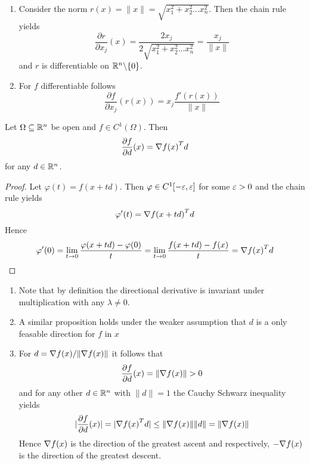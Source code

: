\begin{examples}\hfill
    \begin{enumerate}
        \item Consider the norm \( r(x) = \|x\| = \sqrt{x_1^2 + x_2^2 \dots x_n^2} \). Then the chain rule yields
              \[
                  \frac{\partial r}{\partial x_j}(x) = \frac{2 x_j}{2 \sqrt{x_1^2 + x_2^2 \dots x_n^2}}
                  = \frac{x_j}{\|x\|}
              \]
              and \( r \) is differentiable on \( \mathbb{R}^n {\setminus} \{ 0 \} \).
        \item For \( f \) differentiable follows
              \[
                  \frac{\partial f}{\partial x_j}(r(x)) = x_j \frac{f'(r(x))}{\|x\|}
              \]
    \end{enumerate}
\end{examples}
\bigskip


\begin{lemma}\label{lemma:directional_derivative}
    Let \( \Omega \subseteq \mathbb{R}^n \) be open and \( f \in C^1(\Omega) \). Then
    \[
        \frac{\partial f}{\partial d}(x) = \nabla{f(x)}^T d
    \]
    for any \( d \in \mathbb{R}^n \).
\end{lemma}

\begin{proof}
    Let \( \varphi(t) = f(x + td) \). Then \( \varphi \in C^1[-\varepsilon, \varepsilon ] \) for some \( \varepsilon > 0 \)
    and the chain rule yields
    \[
        \varphi'(t) = {\nabla f(x + td)}^T d
    \]
    Hence
    \[
        \varphi'(0) = \lim_{t \to 0} \frac{\varphi(x + td) - \varphi(0)}{t} =
        \lim_{t \to 0} \frac{f(x + td) - f(x)}{t} = {\nabla f(x)}^T d
    \]
\end{proof}
\bigskip


\begin{remarks}\hfill
    \begin{enumerate}
        \item Note that by definition the directional derivative is invariant under multiplication
              with any \( \lambda \ne 0 \).

        \item A similar proposition holds under the weaker assumption that \( d \) is a only feasable direction
              for \( f \) in \( x \)

        \item For \( d = \nabla{f(x)}/\| \nabla{f(x)}\| \) it follows that
              \[
                  \frac{\partial f}{\partial d}(x) = \|\nabla{f(x)}\| > 0
              \]
              and for any other \( d \in \mathbb{R}^n \) with \( \|d\| = 1 \) the Cauchy Schwarz inequality yields
              \[
                  |\frac{\partial f}{\partial d}(x)| = |\nabla{f(x)}^T d| \le \|\nabla{f(x)}\| \|d\| =
                  \|\nabla{f(x)}\|
              \]
              Hence \( \nabla{f(x)} \) is the direction of the greatest ascent and respectively,
              \( -\nabla{f(x)} \) is the direction of the greatest descent.
    \end{enumerate}
\end{remarks}
\bigskip


